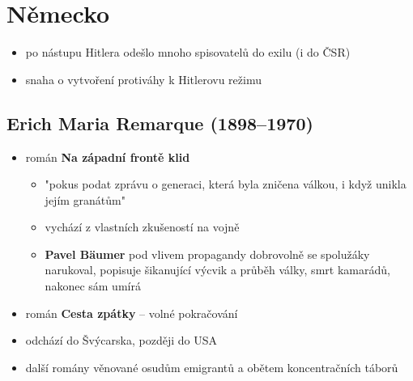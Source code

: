 \section{Německo}
\begin{itemize}
\item po nástupu Hitlera odešlo mnoho spisovatelů do exilu (i do ČSR)
\item snaha o vytvoření protiváhy k Hitlerovu režimu
\end{itemize}

\subsection{Erich Maria Remarque (1898--1970)}
\begin{itemize}
\item román \textbf{Na západní frontě klid}
	\begin{itemize}
	\item "pokus podat zprávu o generaci, která byla zničena válkou, i když unikla jejím granátům"
	\item vychází z vlastních zkušeností na vojně
	\item \textbf{Pavel Bäumer} pod vlivem propagandy dobrovolně se spolužáky narukoval, popisuje šikanující výcvik a průběh války, smrt kamarádů, nakonec sám umírá
	\end{itemize}
\item román \textbf{Cesta zpátky} -- volné pokračování
\item odchází do Švýcarska, později do USA
\item další romány věnované osudům emigrantů a obětem koncentračních táborů
\end{itemize}

